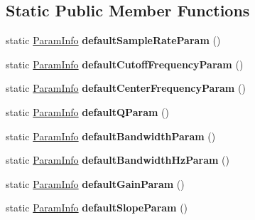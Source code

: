 \subsection*{Static Public Member Functions}
\begin{DoxyCompactItemize}
\item 
\hypertarget{classDsp_1_1ParamInfo_ab0f41d6bf0777442a30d4f58e43cd5ec}{static \hyperlink{classDsp_1_1ParamInfo}{Param\-Info} {\bfseries default\-Sample\-Rate\-Param} ()}\label{classDsp_1_1ParamInfo_ab0f41d6bf0777442a30d4f58e43cd5ec}

\item 
\hypertarget{classDsp_1_1ParamInfo_a21b5bbf4f22d8836aa4f097f9697de68}{static \hyperlink{classDsp_1_1ParamInfo}{Param\-Info} {\bfseries default\-Cutoff\-Frequency\-Param} ()}\label{classDsp_1_1ParamInfo_a21b5bbf4f22d8836aa4f097f9697de68}

\item 
\hypertarget{classDsp_1_1ParamInfo_a1d2399011a5f0b8025e5dcc4df7702d1}{static \hyperlink{classDsp_1_1ParamInfo}{Param\-Info} {\bfseries default\-Center\-Frequency\-Param} ()}\label{classDsp_1_1ParamInfo_a1d2399011a5f0b8025e5dcc4df7702d1}

\item 
\hypertarget{classDsp_1_1ParamInfo_a31a00a7dd7fc0d8e83f0685f71eb3f5c}{static \hyperlink{classDsp_1_1ParamInfo}{Param\-Info} {\bfseries default\-Q\-Param} ()}\label{classDsp_1_1ParamInfo_a31a00a7dd7fc0d8e83f0685f71eb3f5c}

\item 
\hypertarget{classDsp_1_1ParamInfo_a39bd04117d6f87a02344cd610dc9d0f5}{static \hyperlink{classDsp_1_1ParamInfo}{Param\-Info} {\bfseries default\-Bandwidth\-Param} ()}\label{classDsp_1_1ParamInfo_a39bd04117d6f87a02344cd610dc9d0f5}

\item 
\hypertarget{classDsp_1_1ParamInfo_abcf3cd3ce180caae4f950e798d7dc5dd}{static \hyperlink{classDsp_1_1ParamInfo}{Param\-Info} {\bfseries default\-Bandwidth\-Hz\-Param} ()}\label{classDsp_1_1ParamInfo_abcf3cd3ce180caae4f950e798d7dc5dd}

\item 
\hypertarget{classDsp_1_1ParamInfo_a5fc8f44da8efad6686547e3917f79a10}{static \hyperlink{classDsp_1_1ParamInfo}{Param\-Info} {\bfseries default\-Gain\-Param} ()}\label{classDsp_1_1ParamInfo_a5fc8f44da8efad6686547e3917f79a10}

\item 
\hypertarget{classDsp_1_1ParamInfo_a390747cacf72bd358768219b5597cf7d}{static \hyperlink{classDsp_1_1ParamInfo}{Param\-Info} {\bfseries default\-Slope\-Param} ()}\label{classDsp_1_1ParamInfo_a390747cacf72bd358768219b5597cf7d}


\end{DoxyCompactItemize}
